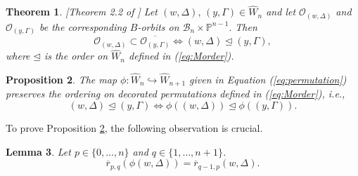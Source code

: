 \documentclass[12pt]{amsart}
\numberwithin{equation}{section}
\newtheorem{thm}{Theorem}[section]
\newtheorem{lem}[thm]{Lemma}
\newtheorem{prop}[thm]{Proposition}
\newcommand{\cW}{{ W}}
\newcommand{\B}{\mathcal{B}}
\begin{document}
\begin{thm}\label{thm:Magyarclosure}\emph{[Theorem 2.2 of \cite{Magyar}]}
Let $(w,\Delta),\, (y,\Gamma)\in \widehat{\cW}_{n}$ and let $\mathcal{O}_{(w,\Delta)}$ and $\mathcal{O}_{(y,\Gamma)}$ be the corresponding $B$-orbits on $\B_{n}\times\mathbb{P}^{n-1}.$ Then 
$$
\mathcal{O}_{(w,\Delta)}\subset\overline{\mathcal{O}_{(y,\Gamma)}}\Leftrightarrow (w,\Delta)\unlhd (y,\Gamma),
$$
where $\unlhd$ is the order on $\widehat{\cW}_{n}$ defined in (\ref{eq:Morder}).
\end{thm}
\begin{prop}\label{p:orderpreserving}
The map $\phi: \widehat{\cW}_{n}\hookrightarrow\widehat{\cW}_{n+1}$ given in Equation (\ref{eq:permutation}) preserves the ordering on decorated permutations defined in (\ref{eq:Morder}), i.e., 
\begin{equation}\label{eq:orderpreserve}
(w,\Delta)\unlhd (y,\Gamma)\Leftrightarrow \phi((w,\Delta))\unlhd \phi((y,\Gamma)).
\end{equation}
\end{prop}
\noindent %
  To prove Proposition \ref{p:orderpreserving},  the following observation is crucial.   
\begin{lem}\label{l:compare}
Let $p\in\{0,\dots, n\}$ and $q\in\{1,\dots, n+1\}$.  %
\begin{equation}\label{eq:shift}
\overline{r}_{p,q}(\phi(w,\Delta))=\overline{r}_{q-1,p} (w,\Delta).
\end{equation}
\end{lem}
\end{document}

